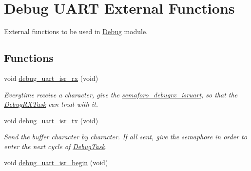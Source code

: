 \hypertarget{group___debug___u_a_r_t___external___functions}{}\section{Debug U\+A\+RT External Functions}
\label{group___debug___u_a_r_t___external___functions}


External functions to be used in \hyperlink{group___debug}{Debug} module.  


\subsection*{Functions}
\begin{DoxyCompactItemize}
\item 
void \hyperlink{group___debug___u_a_r_t___external___functions_ga2e1878be0250daf30f0a286af6e683e9}{debug\+\_\+uart\+\_\+isr\+\_\+rx} (void)\hypertarget{group___debug___u_a_r_t___external___functions_ga2e1878be0250daf30f0a286af6e683e9}{}\label{group___debug___u_a_r_t___external___functions_ga2e1878be0250daf30f0a286af6e683e9}

\begin{DoxyCompactList}\small\item\em Everytime receive a character, give the \hyperlink{group___debug___private___variables_gaeefc3248920a99b9436147de4aeff800}{semaforo\+\_\+debugrx\+\_\+isruart}, so that the \hyperlink{group___debug___exported___functions___group2_ga8013ff117a9e96e630d30771cf9b0199}{Debug\+R\+X\+Task} can treat with it. \end{DoxyCompactList}\item 
void \hyperlink{group___debug___u_a_r_t___external___functions_gaee765dd75f3414ade869071798ff33f4}{debug\+\_\+uart\+\_\+isr\+\_\+tx} (void)\hypertarget{group___debug___u_a_r_t___external___functions_gaee765dd75f3414ade869071798ff33f4}{}\label{group___debug___u_a_r_t___external___functions_gaee765dd75f3414ade869071798ff33f4}

\begin{DoxyCompactList}\small\item\em Send the buffer character by character. If all sent, give the semaphore in order to enter the next cycle of \hyperlink{group___debug___exported___functions___group2_ga0e7fca846e34e06a1f62249fe8a30a44}{Debug\+Task}. \end{DoxyCompactList}\item 
void \hyperlink{group___debug___u_a_r_t___external___functions_ga9d19c0e57b2d37c01bd781338322f682}{debug\+\_\+uart\+\_\+isr\+\_\+begin} (void)\hypertarget{group___debug___u_a_r_t___external___functions_ga9d19c0e57b2d37c01bd781338322f682}{}\label{group___debug___u_a_r_t___external___functions_ga9d19c0e57b2d37c01bd781338322f682}


\end{DoxyCompactItemize}
